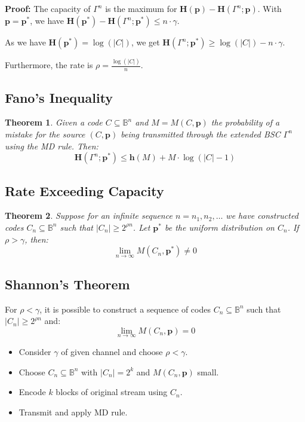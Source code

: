 \documentclass[11pt]{article}
\newtheorem{theo}{Theorem}
\begin{document}
\textbf{Proof:}
The capacity of $\Gamma^n$ is the maximum for $\textbf{H}(\textbf{p}) - \textbf{H}(\Gamma^n ; \textbf{p})$.
With $\textbf{p} = \textbf{p}^*$, we have $\textbf{H}(\textbf{p}^*) - \textbf{H}(\Gamma^n ; \textbf{p}^*) \leq n \cdot \gamma$.

As we have $\textbf{H}(\textbf{p}^*) = \log(\lvert C \rvert)$, we get $\textbf{H}(\Gamma^n ; \textbf{p}^*) \geq \log(\lvert C \rvert) - n \cdot \gamma$.

Furthermore, the rate is $\rho = \frac{\log(\lvert C \rvert)}{n}$.

\subsection{Fano's Inequality}
\begin{theo}
  Given a code $C \subseteq \mathbb{B}^n$ and $M = M(C, \textbf{p})$ the probability of a mistake for the source $(C, \textbf{p})$ being transmitted through the extended BSC $\Gamma^n$ using the MD rule.
  Then:
  \[
    \textbf{H}(\Gamma^n ; \textbf{p}^*) \leq \textbf{h}(M) + M \cdot \log(\lvert C \rvert - 1)
  \]
\end{theo}

\subsection{Rate Exceeding Capacity}
\begin{theo}
  Suppose for an infinite sequence $n = n_1, n_2, \ldots$ we have constructed codes $C_n \subseteq \mathbb{B}^n$ such that $\lvert C_n \rvert \geq 2^{\rho n}$.
  Let $\textbf{p}^*$ be the uniform distribution on $C_n$.
  If $\rho > \gamma$, then:
  \[
    \lim_{n \rightarrow \infty} M(C_n, \textbf{p}^*) \neq 0
  \]
\end{theo}

\subsection{Shannon's Theorem}
For $\rho < \gamma$, it is possible to construct a sequence of codes $C_n \subseteq \mathbb{B}^n$ such that $\lvert C_n \rvert \geq 2^{\rho n}$ and:
\[
  \lim_{n \rightarrow \infty} M(C_n, \textbf{p}) = 0
\]

\begin{itemize}
  \item Consider $\gamma$ of given channel and choose $\rho < \gamma$.
  \item Choose $C_n \subseteq \mathbb{B}^n$ with $\lvert C_n \rvert = 2^k$ and $M(C_n, \textbf{p})$ small.
  \item Encode $k$ blocks of original stream using $C_n$.
  \item Transmit and apply MD rule.
\end{itemize}
\end{document}
